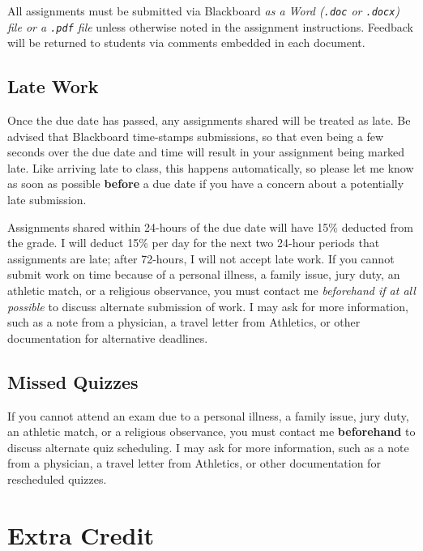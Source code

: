 \documentclass[
]{book}
\begin{document}
All assignments must be submitted via Blackboard \emph{as a Word (\texttt{.doc} or \texttt{.docx}) file or a \texttt{.pdf} file} unless otherwise noted in the assignment instructions. Feedback will be returned to students via comments embedded in each document.

\hypertarget{late-work}{%
\subsection{Late Work}\label{late-work}}

Once the due date has passed, any assignments shared will be treated as late. Be advised that Blackboard time-stamps submissions, so that even being a few seconds over the due date and time will result in your assignment being marked late. Like arriving late to class, this happens automatically, so please let me know as soon as possible \textbf{before} a due date if you have a concern about a potentially late submission.

Assignments shared within 24-hours of the due date will have 15\% deducted from the grade. I will deduct 15\% per day for the next two 24-hour periods that assignments are late; after 72-hours, I will not accept late work. If you cannot submit work on time because of a personal illness, a family issue, jury duty, an athletic match, or a religious observance, you must contact me \emph{beforehand if at all possible} to discuss alternate submission of work. I may ask for more information, such as a note from a physician, a travel letter from Athletics, or other documentation for alternative deadlines.

\hypertarget{missed-quizzes}{%
\subsection{Missed Quizzes}\label{missed-quizzes}}

If you cannot attend an exam due to a personal illness, a family issue, jury duty, an athletic match, or a religious observance, you must contact me \textbf{beforehand} to discuss alternate quiz scheduling. I may ask for more information, such as a note from a physician, a travel letter from Athletics, or other documentation for rescheduled quizzes.

\hypertarget{extra-credit}{%
\section{Extra Credit}\label{extra-credit}}
\end{document}
